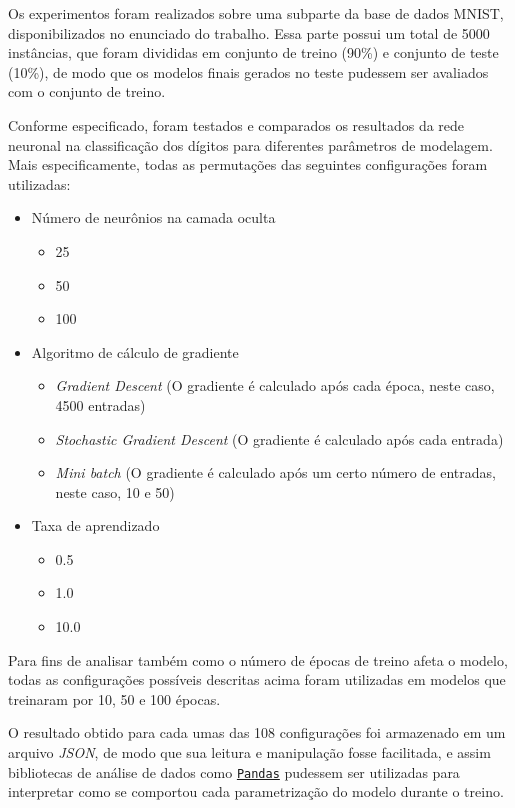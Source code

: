 \documentclass{article}
\begin{document}
Os experimentos foram realizados sobre uma subparte da base de dados MNIST, disponibilizados no enunciado do trabalho. Essa parte possui um total de 5000 instâncias, que foram divididas em conjunto de treino (90\%) e conjunto de teste (10\%), de modo
que os modelos finais gerados no teste pudessem ser avaliados com o conjunto de treino.

Conforme especificado, foram testados e comparados os resultados da rede neuronal na classificação dos dígitos para diferentes parâmetros de modelagem. Mais especificamente, todas as permutações das seguintes configurações foram utilizadas:

\begin{itemize}
    \item Número de neurônios na camada oculta
        \begin{itemize}
            \item 25
            \item 50
            \item 100
        \end{itemize}
    \item Algoritmo de cálculo de gradiente 
        \begin{itemize}
            \item \textit{Gradient Descent} (O gradiente é calculado após cada época, neste caso, 4500 entradas)
            \item \textit{Stochastic Gradient Descent} (O gradiente é calculado após cada entrada)
            \item \textit{Mini batch} (O gradiente é calculado após um certo número de entradas, neste caso, 10 e 50)
        \end{itemize}
    \item Taxa de aprendizado 
        \begin{itemize}
            \item 0.5
            \item 1.0
            \item 10.0
        \end{itemize}
\end{itemize}

Para fins de analisar também como o número de épocas de treino afeta o modelo, todas as configurações possíveis descritas acima foram utilizadas em modelos que treinaram por 10, 50 e 100 épocas.

O resultado obtido para cada umas das 108 configurações foi armazenado em um arquivo \textit{JSON}, de modo que sua leitura e manipulação fosse facilitada, e assim bibliotecas de análise de dados como \href{https://pandas.pydata.org/}{\texttt{Pandas}} pudessem ser utilizadas para interpretar
como se comportou cada parametrização do modelo durante o treino.
\end{document}
